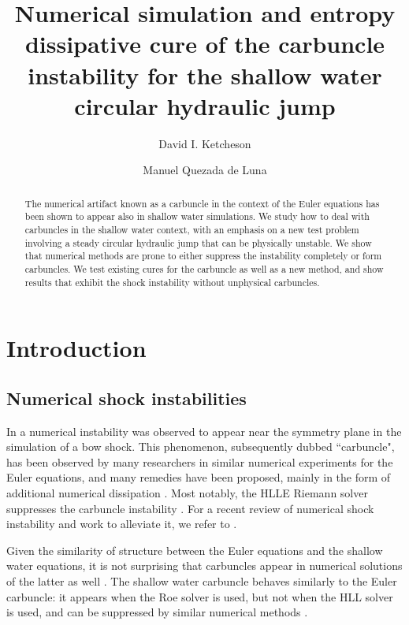 \documentclass[preprint, 11pt]{article}
\title{Numerical simulation and entropy dissipative cure of the
  carbuncle instability for the shallow water circular hydraulic jump}
\author{
    David I. Ketcheson \and
    Manuel Quezada de Luna
}
\begin{document}
\maketitle

\begin{abstract}
The numerical artifact known as a carbuncle in the context of the Euler
equations has been shown to appear also in shallow water simulations.
We study how to deal with carbuncles in the shallow water context,
with an emphasis on a new test problem involving a steady circular hydraulic
jump that can be physically unstable.  We show that numerical methods are prone to
either suppress the instability completely or form carbuncles.
We test existing cures for the carbuncle as well as a new method,
and show results that exhibit the shock instability without unphysical carbuncles.
\end{abstract}



\section{Introduction}

\subsection{Numerical shock instabilities}

In \cite{peery1988blunt} a numerical instability was observed to
appear near the symmetry plane in the simulation of a bow shock.
This phenomenon, subsequently dubbed ``carbuncle", has been observed by many researchers
in similar numerical experiments for the Euler equations, and many remedies
have been proposed, mainly in the form of additional numerical dissipation
\cite{quirk1997contribution,pandolfi2001numerical,dumbser2004matrix,chauvat2005shock,ismail2009proposed,shen2014stability}.
Most notably, the HLLE Riemann solver suppresses the carbuncle instability \cite{quirk1997contribution}.
For a recent review of numerical shock instability and work to alleviate it,
we refer to \cite[Section 2.5]{simonnumerical}.

Given the similarity of structure between the Euler equations and the shallow
water equations, it is not surprising that carbuncles appear in numerical
solutions of the latter as well \cite{kemm2014note}.
The shallow water carbuncle behaves similarly to the
Euler carbuncle: it appears when the Roe solver is used, but not when
the HLL solver is used, and can be suppressed by similar numerical methods
\cite{kemm2014note,bader2014carbuncle}.
\end{document}
